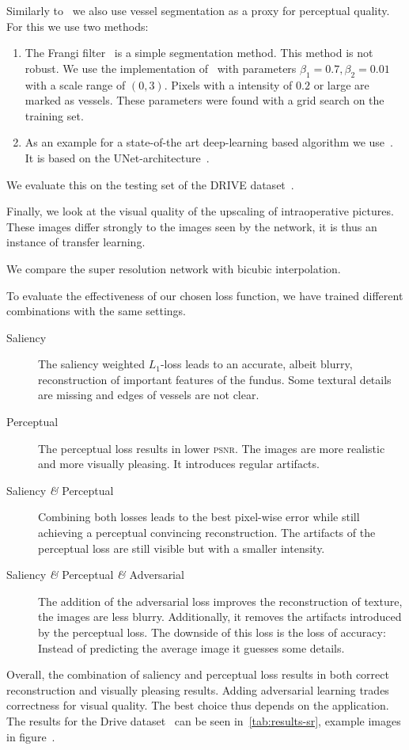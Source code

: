 \documentclass{scrartcl}
\begin{document}
Similarly to~\cite{SaliencyGAN} we also use vessel segmentation as a proxy for perceptual quality.
For this we use two methods:
\begin{enumerate}
  \item The Frangi filter~\cite{Frangi} is a simple segmentation method.
  This method is not robust.
  We use the implementation of~\cite{Scikit-image} with parameters $\beta_1 = 0.7, \beta_2=0.01$ with a scale range of $(0, 3)$.
  Pixels with a intensity of $0.2$ or large are marked as vessels.
  These parameters were found with a grid search on the training set.
\item As an example for a state-of-the art deep-learning based algorithm we use~\cite{RetinaUnet}.
  It is based on the UNet-architecture~\cite{Unet}.
\end{enumerate}
We evaluate this on the testing set of the DRIVE dataset~\cite{Drive}.

Finally, we look at the visual quality of the upscaling of intraoperative pictures.
These images differ strongly to the images seen by the network, it is thus an instance of transfer learning.

We compare the super resolution network with bicubic interpolation.

To evaluate the effectiveness of our chosen loss function, we have trained different combinations with the same settings.
\begin{description}
\item[Saliency] The saliency weighted $L_1$-loss leads to an accurate, albeit blurry, reconstruction of important features of the fundus.
  Some textural details are missing and edges of vessels are not clear.
\item[Perceptual] The perceptual loss results in lower \textsc{psnr}.
  The images are more realistic and more visually pleasing.
  It introduces regular artifacts.
\item[Saliency \textit{\&} Perceptual] Combining both losses leads to the best pixel-wise error while still achieving a perceptual convincing reconstruction.
  The artifacts of the perceptual loss are still visible but with a smaller intensity.
\item[Saliency \textit{\&} Perceptual \textit{\&} Adversarial]
  The addition of the adversarial loss improves the reconstruction of texture, the images are less blurry.
  Additionally, it removes the artifacts introduced by the perceptual loss.
  The downside of this loss is the loss of accuracy:
  Instead of predicting the average image it guesses some details.
\end{description}
Overall, the combination of saliency and perceptual loss results in both correct reconstruction and visually pleasing results.
Adding adversarial learning trades correctness for visual quality.
The best choice thus depends on the application.
The results for the Drive dataset~\cite{Drive} can be seen in~\cref{tab:results-sr}, example images in figure~.
\end{document}
